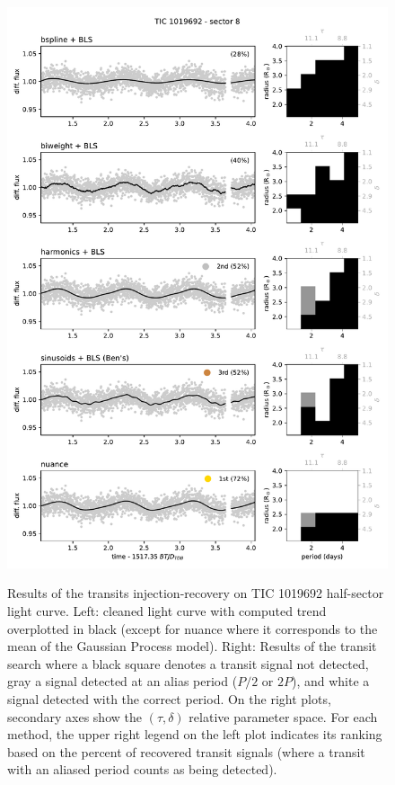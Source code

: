 \documentclass[modern]{aastex631}
\begin{document}
\begin{figure}[H]
    \begin{centering}
        \includegraphics[width=\linewidth]{../workflows/tess_injection_recovery/figures/searched/1019692.pdf}
    \end{centering}
\end{figure}

\begin{figure}[H]
    \begin{centering}
        \caption{Results of the transits injection-recovery on TIC 1019692 half-sector light curve. Left: cleaned light curve with computed trend overplotted in black (except for \textsf{nuance} where it corresponds to the mean of the Gaussian Process model). Right: Results of the transit search where a black square denotes a transit signal not detected, gray a signal detected at an alias period ($P/2$ or $2P$), and  white a signal detected with the correct period. On the right plots, secondary axes show the $(\tau, \delta)$ relative parameter space. For each method, the upper right legend on the left plot indicates its ranking based on the percent of recovered transit signals (where a transit with an aliased period counts as being detected).
        }
        \label{fig:onesearch}
    \end{centering}
\end{figure}



\end{document}

